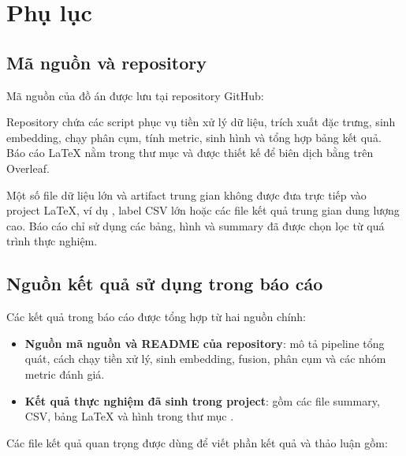 \section{Phụ lục}
\label{app:appendix}

\subsection{Mã nguồn và repository}

Mã nguồn của đồ án được lưu tại repository GitHub:

\begin{center}
\href{https://github.com/medneko/Project-II}{}
\end{center}

Repository chứa các script phục vụ tiền xử lý dữ liệu, trích xuất đặc trưng, sinh embedding, chạy phân cụm, tính metric, sinh hình và tổng hợp bảng kết quả. Báo cáo LaTeX nằm trong thư mục  và được thiết kế để biên dịch bằng  trên Overleaf.

Một số file dữ liệu lớn và artifact trung gian không được đưa trực tiếp vào project LaTeX, ví dụ , label CSV lớn hoặc các file kết quả trung gian dung lượng cao. Báo cáo chỉ sử dụng các bảng, hình và summary đã được chọn lọc từ quá trình thực nghiệm.

\subsection{Nguồn kết quả sử dụng trong báo cáo}

Các kết quả trong báo cáo được tổng hợp từ hai nguồn chính:

\begin{itemize}
    \item \textbf{Nguồn mã nguồn và README của repository}: mô tả pipeline tổng quát, cách chạy tiền xử lý, sinh embedding, fusion, phân cụm và các nhóm metric đánh giá.
    \item \textbf{Kết quả thực nghiệm đã sinh trong project}: gồm các file summary, CSV, bảng LaTeX và hình trong thư mục .
\end{itemize}

Các file kết quả quan trọng được dùng để viết phần kết quả và thảo luận gồm:

